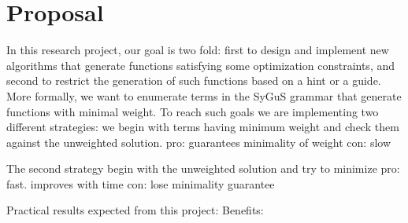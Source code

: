 \section{Proposal}
\label{sec:proposal}
%
In this research project, our goal is two fold:
%
first to design and implement new algorithms that generate functions satisfying some optimization constraints,
%
and second to restrict the generation of such functions based on a hint or a guide.
%
More formally, we want to enumerate terms in the SyGuS grammar that generate functions with minimal weight.
%
To reach such goals we are implementing two different strategies: we begin with terms having minimum weight and check them against the unweighted solution.
%
pro: guarantees minimality of weight
con: slow

The second strategy begin with the unweighted solution and try to minimize
pro: fast. improves with time
con: lose minimality guarantee

Practical results expected from this project:
Benefits: 
